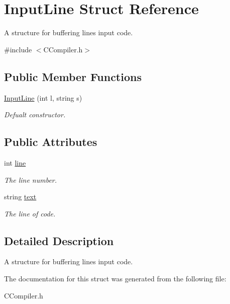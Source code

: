 \hypertarget{structInputLine}{\section{Input\-Line Struct Reference}
\label{structInputLine}
}


A structure for buffering lines input code.  




{\ttfamily \#include $<$C\-Compiler.\-h$>$}

\subsection*{Public Member Functions}
\begin{DoxyCompactItemize}
\item 
\hypertarget{structInputLine_a6a57eafd6e53ea99651327e174c52077}{\hyperlink{structInputLine_a6a57eafd6e53ea99651327e174c52077}{Input\-Line} (int l, string s)}\label{structInputLine_a6a57eafd6e53ea99651327e174c52077}

\begin{DoxyCompactList}\small\item\em Defualt constructor. \end{DoxyCompactList}\end{DoxyCompactItemize}
\subsection*{Public Attributes}
\begin{DoxyCompactItemize}
\item 
\hypertarget{structInputLine_aef26343331dc90be48f6fdbf4ab85276}{int \hyperlink{structInputLine_aef26343331dc90be48f6fdbf4ab85276}{line}}\label{structInputLine_aef26343331dc90be48f6fdbf4ab85276}

\begin{DoxyCompactList}\small\item\em The line number. \end{DoxyCompactList}\item 
\hypertarget{structInputLine_aa448799cf6fd6735d55c2cadb394e16f}{string \hyperlink{structInputLine_aa448799cf6fd6735d55c2cadb394e16f}{text}}\label{structInputLine_aa448799cf6fd6735d55c2cadb394e16f}

\begin{DoxyCompactList}\small\item\em The line of code. \end{DoxyCompactList}\end{DoxyCompactItemize}


\subsection{Detailed Description}
A structure for buffering lines input code. 

The documentation for this struct was generated from the following file\-:\begin{DoxyCompactItemize}
\item 
C\-Compiler.\-h\end{DoxyCompactItemize}

